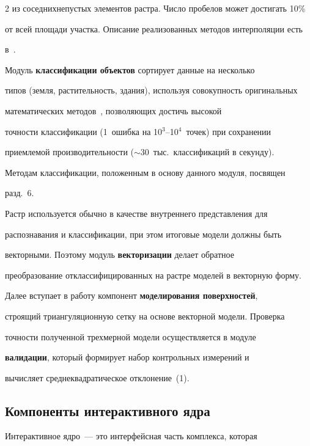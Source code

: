 \begin{multicols}{2}
из соседних\linebreak непустых элементов растра. Число пробелов может достигать 10\% 

от всей площади участка. Описание реализованных методов интерполяции есть 

в~\cite{5su}.

   

   Модуль \textbf{классификации объектов} сортирует данные на несколько 

типов (земля, растительность, здания), используя совокупность оригинальных 

математических методов~\cite{6su, 7su}, позволяющих достичь высокой 

точности классификации (1~ошибка на 10$^3$--10$^4$~точек) при сохранении 

приемлемой производительности ($\sim 30$~тыс.\ классификаций в секунду). 

Методам классификации, положенным в основу данного модуля, посвящен 

разд.~6.

   

   Растр используется обычно в качестве внутреннего представления для 

распознавания и классификации, при этом итоговые модели должны быть 

векторными. Поэтому модуль \textbf{векторизации} делает обратное 

преобразование отклассифицированных на растре моделей в векторную форму. 

Далее вступает в работу компонент \textbf{моделирования поверхностей}, 

строящий триангуляционную сетку на основе векторной модели. Проверка 

точности полученной трехмерной модели осуществляется в модуле 

\textbf{валидации}, который формирует набор контрольных измерений и 

вычисляет среднеквадратическое отклонение~(1).

   



\subsection{Компоненты интерактивного ядра} %

   

   Интерактивное ядро~--- это интерфейсная часть комплекса, которая 


\end{multicols}
